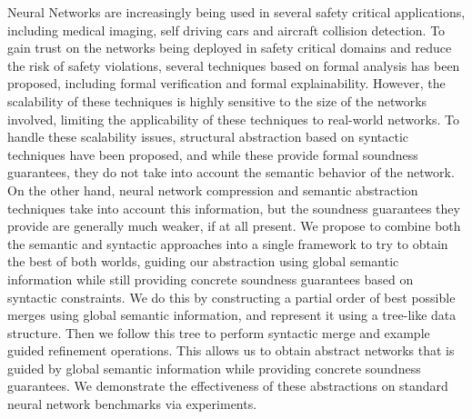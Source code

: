 Neural Networks are increasingly being used in several safety critical
applications, including medical imaging, self driving cars and aircraft
collision detection. To gain trust on the networks being deployed in safety
critical domains and reduce the risk of safety violations, several techniques
based on formal analysis has been proposed, including formal verification and
formal explainability. However, the scalability of these techniques is highly
sensitive to the size of the networks involved, limiting the applicability of
these techniques to real-world networks. To handle these scalability issues,
structural abstraction based on syntactic techniques have been proposed, and
while these provide formal soundness guarantees, they do not take into account
the semantic behavior of the network. On the other hand, neural network
compression and semantic abstraction 
techniques take into account this information, but the soundness guarantees they
provide are generally much weaker, if at all present. We propose to combine both
the semantic and syntactic approaches into a single framework to try to obtain
the best of both worlds, guiding our abstraction using global semantic
information while still providing concrete soundness guarantees based on
syntactic constraints. We do this by constructing a partial order of best
possible merges using global semantic information, and represent it using a
tree-like data structure. Then we follow this tree to perform syntactic merge
and example guided  refinement operations. This
allows us to obtain abstract networks that is guided by global semantic
information while providing concrete soundness guarantees. We demonstrate the
effectiveness of these abstractions on standard neural network benchmarks via
experiments.
